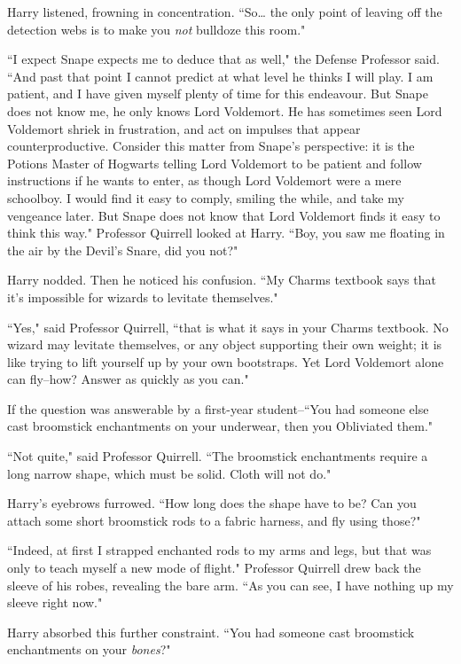 Harry listened, frowning in concentration. ``So{\ldots} the only point of leaving off the detection webs is to make you \emph{not} bulldoze this room."

``I expect Snape expects me to deduce that as well," the Defense Professor said. ``And past that point I cannot predict at what level he thinks I will play. I am patient, and I have given myself plenty of time for this endeavour. But Snape does not know me, he only knows Lord Voldemort. He has sometimes seen Lord Voldemort shriek in frustration, and act on impulses that appear counterproductive. Consider this matter from Snape's perspective: it is the Potions Master of Hogwarts telling Lord Voldemort to be patient and follow instructions if he wants to enter, as though Lord Voldemort were a mere schoolboy. I would find it easy to comply, smiling the while, and take my vengeance later. But Snape does not know that Lord Voldemort finds it easy to think this way." Professor Quirrell looked at Harry. ``Boy, you saw me floating in the air by the Devil's Snare, did you not?"

Harry nodded. Then he noticed his confusion. ``My Charms textbook says that it's impossible for wizards to levitate themselves."

``Yes," said Professor Quirrell, ``that is what it says in your Charms textbook. No wizard may levitate themselves, or any object supporting their own weight; it is like trying to lift yourself up by your own bootstraps. Yet Lord Voldemort alone can fly\---how? Answer as quickly as you can."

If the question was answerable by a first-year student\---``You had someone else cast broomstick enchantments on your underwear, then you Obliviated them."

``Not quite," said Professor Quirrell. ``The broomstick enchantments require a long narrow shape, which must be solid. Cloth will not do."

Harry's eyebrows furrowed. ``How long does the shape have to be? Can you attach some short broomstick rods to a fabric harness, and fly using those?"

``Indeed, at first I strapped enchanted rods to my arms and legs, but that was only to teach myself a new mode of flight." Professor Quirrell drew back the sleeve of his robes, revealing the bare arm. ``As you can see, I have nothing up my sleeve right now."

Harry absorbed this further constraint. ``You had someone cast broomstick enchantments on your \emph{bones}?"

